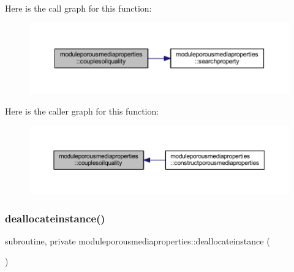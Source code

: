 Here is the call graph for this function\+:\nopagebreak
\begin{figure}[H]
\begin{center}
\leavevmode
\includegraphics[width=350pt]{namespacemoduleporousmediaproperties_a61f775b3725813d36065a3b82e4cdb20_cgraph}
\end{center}
\end{figure}
Here is the caller graph for this function\+:\nopagebreak
\begin{figure}[H]
\begin{center}
\leavevmode
\includegraphics[width=350pt]{namespacemoduleporousmediaproperties_a61f775b3725813d36065a3b82e4cdb20_icgraph}
\end{center}
\end{figure}
\mbox{\label{namespacemoduleporousmediaproperties_a7002642c0fa8ff01f584386876557fef}} 
\subsubsection{\texorpdfstring{deallocateinstance()}{deallocateinstance()}}
{\footnotesize\ttfamily subroutine, private moduleporousmediaproperties\+::deallocateinstance (\begin{DoxyParamCaption}{ }\end{DoxyParamCaption})\hspace{0.3cm}{\ttfamily [private]}}

